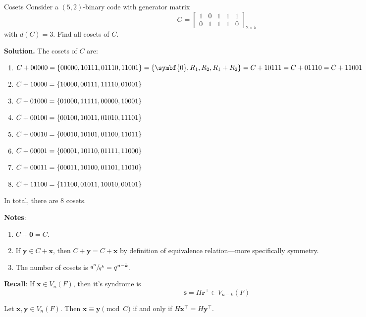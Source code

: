\begin{Example}{Cosets}{}
    Consider a $ (5,2) $-binary code with generator matrix
    \[ G=\begin{bmatrix}
            1 & 0 & 1 & 1 & 1 \\
            0 & 1 & 1 & 1 & 0
        \end{bmatrix}_{2\times 5} \]
    with $ d(C)=3 $. Find all cosets of $ C $.

    \textbf{Solution.} The cosets of $ C $ are:
    \begin{enumerate}[label=(\arabic*)]
        \item $ C+00000=\set{00000,10111,01110,11001}=\set{\symbf{0},R_1,R_2, R_1+R_2}
                  = C+10111 = C+01110 = C + 11001 $
        \item $ C+10000=\{10000,00111,11110,01001\} $
        \item $ C+01000=\{01000,11111,00000,10001\} $
        \item $ C+00100=\{00100,10011,01010,11101\} $
        \item $ C+00010=\{00010,10101,01100,11011\} $
        \item $ C+00001=\{00001,10110,01111,11000\} $
        \item $ C+00011=\{00011,10100,01101,11010\} $
        \item $ C+11100=\{11100,01011,10010,00101\} $
    \end{enumerate}
    In total, there are $ 8 $ cosets.
\end{Example}

\textbf{Notes}:
\begin{enumerate}[label=(\arabic*)]
    \item $ C+\symbf{0}=C $.
    \item If $ \symbf{y}\in C+\symbf{x} $, then $ C+\symbf{y}=C+\symbf{x} $ by definition
          of equivalence relation---more specifically symmetry.
    \item The number of cosets is $ \sfrac{q^n}{q^k}=q^{n-k} $.
\end{enumerate}

\textbf{Recall}: If $ \symbf{x}\in V_n(F) $, then it's syndrome is
\[ \symbf{s}=H\symbf{r}^\top\in V_{n-k}(F) \]

\begin{Theorem}{}{}
    Let $ \symbf{x},\symbf{y}\in V_n(F) $. Then $ \symbf{x}\equiv \symbf{y}\pmod{C} $
    if and only if $ H\symbf{x}^\top=H\symbf{y}^\top $.
\end{Theorem}

